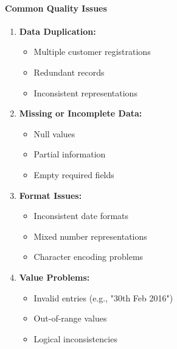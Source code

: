 \documentclass[a4paper,11pt]{article}
\begin{document}
\paragraph{Common Quality Issues}
\begin{enumerate}
    \item \textbf{Data Duplication:}
        \begin{itemize}
            \item Multiple customer registrations
            \item Redundant records
            \item Inconsistent representations
        \end{itemize}
    \item \textbf{Missing or Incomplete Data:}
        \begin{itemize}
            \item Null values
            \item Partial information
            \item Empty required fields
        \end{itemize}
    \item \textbf{Format Issues:}
        \begin{itemize}
            \item Inconsistent date formats
            \item Mixed number representations
            \item Character encoding problems
        \end{itemize}
    \item \textbf{Value Problems:}
        \begin{itemize}
            \item Invalid entries (e.g., "30th Feb 2016")
            \item Out-of-range values
            \item Logical inconsistencies
        \end{itemize}
\end{enumerate}
\end{document}
